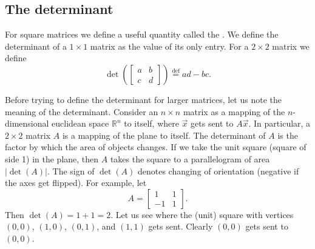 \subsection{The determinant}

For square matrices we define a useful quantity called the
\emph{}.  We define
the determinant of a $1 \times 1$ matrix as the value of its only entry.
For a $2 \times 2$ matrix we define
\begin{equation*}
\det \left(
\begin{bmatrix}
a & b \\
c & d
\end{bmatrix}
\right)
\overset{\text{def}}{=}
ad-bc .
\end{equation*}

Before trying to define the
determinant for larger matrices, let us note
the meaning of the determinant.  Consider an $n \times n$ matrix
as a mapping of the $n$-dimensional euclidean space ${\mathbb{R}}^n$ to 
itself, where $\vec{x}$ gets sent to $A \vec{x}$.
In particular, a $2 \times 2$ matrix $A$ is a mapping of
the plane to itself.  The
determinant of 
$A$ is the factor by which the area of objects changes. 
If we take the unit square (square of side 1) in the plane, then
$A$ takes the square to a parallelogram of area $\lvert\det(A)\rvert$.  The sign
of $\det(A)$ denotes changing of orientation (negative if the axes get flipped).  For
example, let
\begin{equation*}
A =
\begin{bmatrix}
1 & 1 \\
-1 & 1
\end{bmatrix} .
\end{equation*}
Then $\det(A) = 1+1 = 2$.  Let us see where the (unit) square with vertices
$(0,0)$, $(1,0)$, $(0,1)$, and $(1,1)$ gets sent.  Clearly $(0,0)$ gets sent
to $(0,0)$.  
